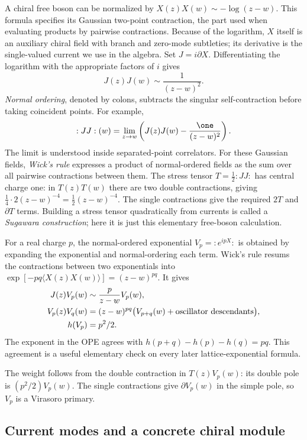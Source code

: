 A chiral free boson can be normalized by
$X(z)X(w)\sim-\log(z-w)$. This formula specifies its Gaussian
two-point contraction, the part used when evaluating products by
pairwise contractions. Because of the logarithm, $X$ itself is an
auxiliary chiral field with branch and zero-mode subtleties; its
derivative is the single-valued current we use in the algebra.
Set $J=i\partial X$. Differentiating
the logarithm with the appropriate factors of $i$ gives
\[
 J(z)J(w)\sim\frac1{(z-w)^2}.
\]
\emph{Normal ordering}, denoted by colons, subtracts the singular
self-contraction before taking coincident points. For example,
\[
 :JJ:(w)=\lim_{z\to w}
       \left(J(z)J(w)-\frac{\one}{(z-w)^2}\right).
\]
The limit is understood inside separated-point correlators.
For these Gaussian fields, \emph{Wick's rule} expresses a product
of normal-ordered fields as the sum over all pairwise contractions
between them. The stress tensor
$T=\tfrac12:JJ:$ has central charge one: in $T(z)T(w)$ there are
two double contractions, giving
$\tfrac14\cdot2(z-w)^{-4}=\tfrac12(z-w)^{-4}$.
The single contractions give the required $2T$ and $\partial T$
terms. Building a stress tensor quadratically from currents is called
a \emph{Sugawara construction}; here it is just this elementary
free-boson calculation.

For a real charge $p$, the normal-ordered exponential
$V_p=:e^{ipX}:$ is obtained by expanding the exponential and
normal-ordering each term. Wick's rule resums the contractions
between two exponentials into
$\exp[-pq\langle X(z)X(w)\rangle]=(z-w)^{pq}$.
It gives
\begin{align}
 J(z)V_p(w)&\sim\frac{p}{z-w}V_p(w),\\
 V_p(z)V_q(w)&=(z-w)^{pq}
       \bigl(V_{p+q}(w)+\hbox{oscillator descendants}\bigr),\\
 h(V_p)&=p^2/2.
 \label{eq:cft-boson-weights}
\end{align}
The exponent in the OPE agrees with
$h(p+q)-h(p)-h(q)=pq$. This agreement is a useful elementary check
on every later lattice-exponential formula.

The weight follows from the double contraction in
$T(z)V_p(w)$: its double pole is $(p^2/2)V_p(w)$.
The single contractions give $\partial V_p(w)$ in the simple pole,
so $V_p$ is a Virasoro primary.

\subsection{Current modes and a concrete chiral module}


